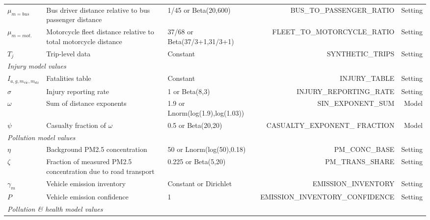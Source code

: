 \documentclass{article}
\begin{document}
\begin{landscape}
\begin{center}
\begin{longtable}{lp{5cm}|lrr}
$\mu_{m=bus}$ & Bus driver distance relative to bus passenger distance & 1/45 or Beta(20,600) & BUS\_TO\_PASSENGER\_RATIO & Setting \\

$\mu_{m=mot.}$ & Motorcycle fleet distance relative to total motorcycle distance & 37/68 or Beta(37/3+1,31/3+1) & FLEET\_TO\_MOTORCYCLE\_RATIO & Setting \\

$T_j$ & Trip-level data & Constant & SYNTHETIC\_TRIPS &    Setting\\


\hline
\multicolumn{2}{l|}{\textit{Injury model values}}\\
\hline

$I_{a,g,m_{\text{vic}},m_{\text{str}}}$ & Fatalities table & Constant & INJURY\_TABLE &   Setting\\

$\sigma$ & Injury reporting rate & 1 or Beta(8,3) & INJURY\_REPORTING\_RATE &  Setting \\ 

$\omega$ & Sum of distance exponents & 1.9 or Lnorm(log(1.9),log(1.03)) & SIN\_EXPONENT\_SUM & Model \\

$\psi$ & Casualty fraction of $\omega$  & 0.5 or Beta(20,20) & CASUALTY\_EXPONENT\_ FRACTION &  Model \\

\hline
\multicolumn{2}{l|}{\textit{Pollution model values}}\\
\hline

$\eta$ & {Background PM2.5 concentration} & 50 or Lnorm(log(50),0.18) &PM\_CONC\_BASE&  Setting\\
$\zeta$ & Fraction of measured PM2.5 concentration due to road transport & 0.225 or Beta(5,20) & PM\_TRANS\_SHARE &   Setting\\

$\gamma_{m}$ & Vehicle emission inventory  & Constant or Dirichlet & EMISSION\_INVENTORY & Setting \\

$P$ & Vehicle emission confidence  & 1 & EMISSION\_INVENTORY\_CONFIDENCE & Setting \\

\hline
\multicolumn{2}{l|}{\textit{Pollution \& health model values}}\\
\hline


\end{longtable}
\end{center}
\end{landscape}
\end{document}
